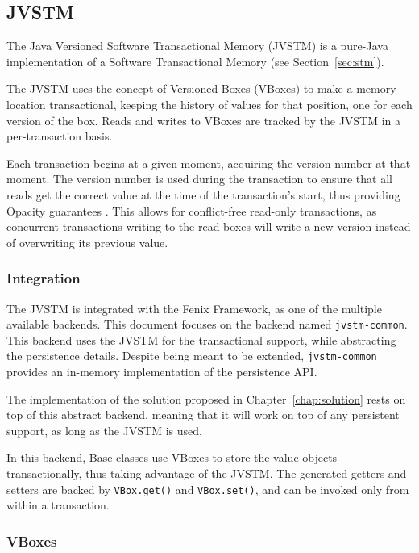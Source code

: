 \documentclass{llncs}
\begin{document}
\subsection{JVSTM}
\label{sec:jvstm}

The Java Versioned Software Transactional Memory (JVSTM)
\cite{cachopo2006versioned} is a pure-Java implementation of a
Software Transactional Memory (see Section~\ref{sec:stm}).

The JVSTM uses the concept of Versioned Boxes (VBoxes) to make a
memory location transactional, keeping the history of values for that
position, one for each version of the box. Reads and writes to VBoxes
are tracked by the JVSTM in a per-transaction basis.

Each transaction begins at a given moment, acquiring the version
number at that moment. The version number is used during the
transaction to ensure that all reads get the correct value at the time
of the transaction's start, thus providing Opacity guarantees
\cite{guerraoui2008correctness}. This allows for conflict-free
read-only transactions, as concurrent transactions writing to the read
boxes will write a new version instead of overwriting its previous
value.

\subsubsection{Integration}

The JVSTM is integrated with the Fenix Framework, as one of the
multiple available backends. This document focuses on the backend
named \texttt{jvstm-common}. This backend uses the JVSTM for the
transactional support, while abstracting the persistence
details. Despite being meant to be extended, \texttt{jvstm-common}
provides an in-memory implementation of the persistence API.

The implementation of the solution proposed in
Chapter~\ref{chap:solution} rests on top of this abstract backend,
meaning that it will work on top of any persistent support, as long as
the JVSTM is used.

In this backend, Base classes use VBoxes to store the value objects
transactionally, thus taking advantage of the JVSTM. The generated
getters and setters are backed by \texttt{VBox.get()} and
\texttt{VBox.set()}, and can be invoked only from within a
transaction.

\subsubsection{VBoxes}
\end{document}
